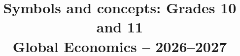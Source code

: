



\usepackage{needspace}
\HighlightViewerLongtableFix
\GTenHighlightstrue
\geometry{a3paper,margin=20mm}
\raggedbottom
\setcounter{tocdepth}{2}
\title{Symbols and concepts: Grades 10 and 11\\[0.5em]
  \large Global Economics -- 2026--2027}
\author{}
\date{}
\newcommand{\PreviewLegend}[2]{%
  \Needspace{12\baselineskip}%
  \subsubsection*{#2}
  \noindent\textbf{Registry key:} \texttt{#1}\par\nobreak
  \begingroup
  \PracticeHighlightLegend{#1}%
  \endgroup
}
\newcommand{\PreviewBackToContents}{%
  \par\smallskip\hyperref[preview:contents]{Back to contents}\par
}

